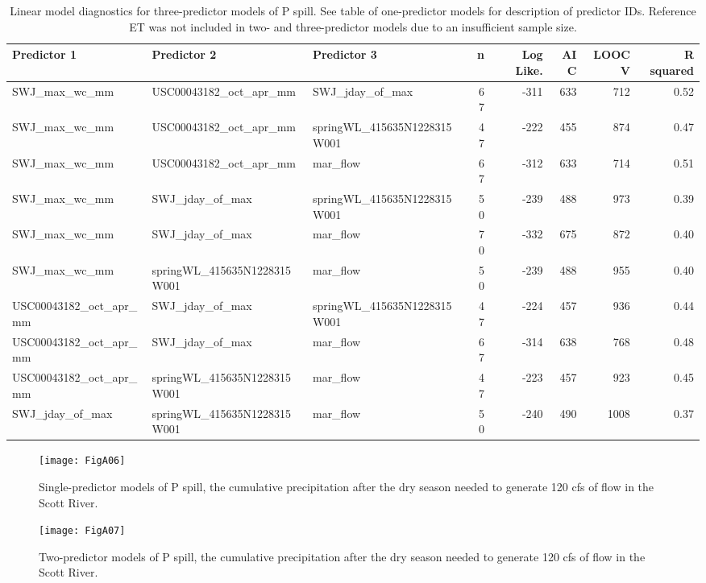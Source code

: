 \documentclass[hess, manuscript]{copernicus}
\begin{document}
\begin{table}[ht]
\centering
\caption{Linear model diagnostics for three-predictor models of P spill. See table of one-predictor models for description of predictor IDs. Reference ET was not included in two- and three-predictor models due to an insufficient sample size.} 
\label{tab:pspill_tab_3pred}
\begingroup\fontsize{8pt}{9pt}\selectfont
\begin{tabular}{lllrrrrr}
  \hline
Predictor 1 & Predictor 2 & Predictor 3 & n & Log Like. & AIC & LOOCV & R squared \\ 
  \hline
SWJ\_max\_wc\_mm & USC00043182\_oct\_apr\_mm & SWJ\_jday\_of\_max & 67 & -311 & 633 & 712 & 0.52 \\ 
  SWJ\_max\_wc\_mm & USC00043182\_oct\_apr\_mm & springWL\_415635N1228315W001 & 47 & -222 & 455 & 874 & 0.47 \\ 
  SWJ\_max\_wc\_mm & USC00043182\_oct\_apr\_mm & mar\_flow & 67 & -312 & 633 & 714 & 0.51 \\ 
  SWJ\_max\_wc\_mm & SWJ\_jday\_of\_max & springWL\_415635N1228315W001 & 50 & -239 & 488 & 973 & 0.39 \\ 
  SWJ\_max\_wc\_mm & SWJ\_jday\_of\_max & mar\_flow & 70 & -332 & 675 & 872 & 0.40 \\ 
  SWJ\_max\_wc\_mm & springWL\_415635N1228315W001 & mar\_flow & 50 & -239 & 488 & 955 & 0.40 \\ 
  USC00043182\_oct\_apr\_mm & SWJ\_jday\_of\_max & springWL\_415635N1228315W001 & 47 & -224 & 457 & 936 & 0.44 \\ 
  USC00043182\_oct\_apr\_mm & SWJ\_jday\_of\_max & mar\_flow & 67 & -314 & 638 & 768 & 0.48 \\ 
  USC00043182\_oct\_apr\_mm & springWL\_415635N1228315W001 & mar\_flow & 47 & -223 & 457 & 923 & 0.45 \\ 
  SWJ\_jday\_of\_max & springWL\_415635N1228315W001 & mar\_flow & 50 & -240 & 490 & 1008 & 0.37 \\ 
   \hline
\end{tabular}
\endgroup
\end{table}

\begin{figure}
\texttt{[image: FigA06]} \caption{\label{fig:one_predictor_model_p_spill} Single-predictor models of P spill, the cumulative precipitation after the dry season needed to generate 120 cfs of flow in the Scott River.}\label{fig:one_predictor_model_p_spill}
\end{figure}

\begin{figure}
\texttt{[image: FigA07]} \caption{\label{fig:two_predictor_model_p_spill} Two-predictor models of P spill, the cumulative precipitation after the dry season needed to generate 120 cfs of flow in the Scott River.}\label{fig:two_predictor_model_p_spill}
\end{figure}
\end{document}
